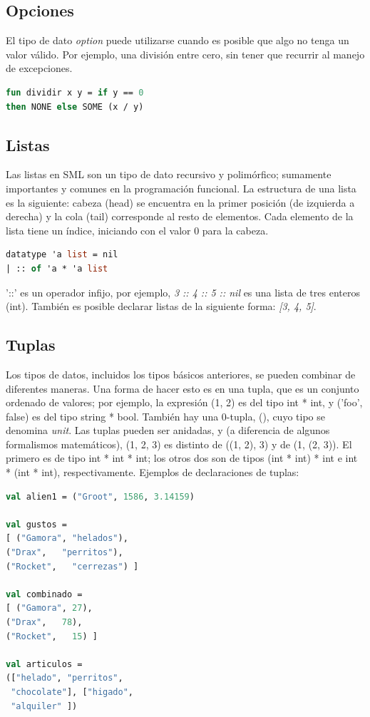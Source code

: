 \documentclass[10pt,journal,compsoc]{IEEEtran}
\begin{document}
\subsection{Opciones}
El tipo de dato \textit{option} puede utilizarse cuando es posible que algo no tenga un valor v\'alido. Por ejemplo, una divisi\'on entre cero, sin tener que recurrir al manejo de excepciones.
\begin{lstlisting}[language=ML, caption=Ejemplo Divisi\'on entre 0]
fun dividir x y = if y == 0
then NONE else SOME (x / y)
\end{lstlisting}

\subsection{Listas}
Las listas en SML son un tipo de dato recursivo y polim\'orfico; sumamente importantes y comunes en la programaci\'on funcional. La estructura de una lista es la siguiente: cabeza (head) se encuentra en la primer posici\'on (de izquierda a derecha) y la cola (tail) corresponde al resto de elementos. Cada elemento de la lista tiene un \'indice, iniciando con el valor 0 para la cabeza.
\begin{lstlisting}[language=ML, caption=Ejemplo Listas]
datatype 'a list = nil
| :: of 'a * 'a list
\end{lstlisting}
'::' es un operador infijo, por ejemplo, \textit{3 :: 4 :: 5 :: nil} es una lista de tres enteros (int). Tambi\'en es posible declarar listas de la siguiente forma: \textit{[3, 4, 5]}.

\subsection{Tuplas}
Los tipos de datos, incluidos los tipos básicos anteriores, se pueden combinar de diferentes maneras. Una forma de hacer esto es en una tupla, que es un conjunto ordenado de valores; por ejemplo, la expresión (1, 2) es del tipo int * int, y ('foo', false) es del tipo string * bool. Tambi\'en hay una 0-tupla, (), cuyo tipo se denomina \textit{unit}.
Las tuplas pueden ser anidadas, y (a diferencia de algunos formalismos matem\'aticos), (1, 2, 3) es distinto de ((1, 2), 3) y de (1, (2, 3)). El primero es de tipo int * int * int; los otros dos son de tipos (int * int) * int e int * (int * int), respectivamente. Ejemplos de declaraciones de tuplas:
\begin{lstlisting}[language=ML, caption=Ejemplo Listas]
val alien1 = ("Groot", 1586, 3.14159)

val gustos = 
[ ("Gamora", "helados"),
("Drax",   "perritos"),
("Rocket",   "cerrezas") ]

val combinado = 
[ ("Gamora", 27),
("Drax",   78),
("Rocket",   15) ]

val articulos =
(["helado", "perritos",
 "chocolate"], ["higado", 
 "alquiler" ])
\end{lstlisting}
\end{document}
